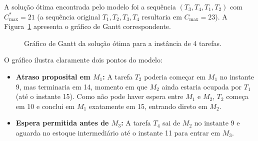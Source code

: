 \documentclass[11pt,a4paper]{article}
\begin{document}
A solução ótima encontrada pelo modelo foi a sequência $(T_3, T_4, T_1, T_2)$ com $C_{\max}^* = 21$ (a sequência original $T_1, T_2, T_3, T_4$ resultaria em $C_{\max} = 23$). A Figura~\ref{fig:gantt} apresenta o gráfico de Gantt correspondente.

\begin{figure}[H]
\centering
{}
\caption{Gráfico de Gantt da solução ótima para a instância de 4 tarefas.}
\label{fig:gantt}
\end{figure}

O gráfico ilustra claramente dois pontos do modelo:
\begin{itemize}
    \item \textbf{Atraso proposital em $M_1$:} A tarefa $T_2$ poderia começar em $M_1$ no instante 9, mas terminaria em 14, momento em que $M_2$ ainda estaria ocupada por $T_1$ (até o instante 15). Como não pode haver espera entre $M_1$ e $M_2$, $T_2$ começa em 10 e conclui em $M_1$ exatamente em 15, entrando direto em $M_2$.
    \item \textbf{Espera permitida antes de $M_3$:} A tarefa $T_4$ sai de $M_2$ no instante 9 e aguarda no estoque intermediário até o instante 11 para entrar em $M_3$.
\end{itemize}
\end{document}
